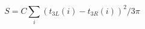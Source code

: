 \begin{equation}
S = C \sum_i \left( t_{3L}(i) - t_{3R}(i) \right)^2 / 3 \pi
\label{capitalS}
\end{equation}

